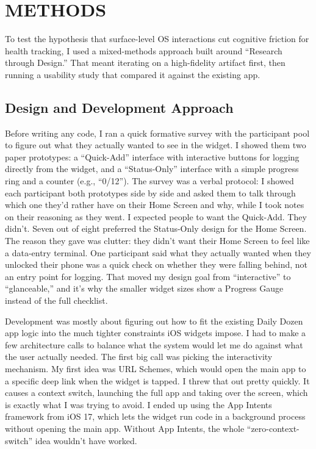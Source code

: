 \documentclass[10pt,twocolumn]{article}
\begin{document}
\section{METHODS}

To test the hypothesis that surface-level OS interactions cut cognitive friction for health tracking, I used a mixed-methods approach built around ``Research through Design.'' That meant iterating on a high-fidelity artifact first, then running a usability study that compared it against the existing app.

\subsection{Design and Development Approach}

Before writing any code, I ran a quick formative survey with the participant pool to figure out what they actually wanted to see in the widget. I showed them two paper prototypes: a ``Quick-Add'' interface with interactive buttons for logging directly from the widget, and a ``Status-Only'' interface with a simple progress ring and a counter (e.g., ``0/12''). The survey was a verbal protocol: I showed each participant both prototypes side by side and asked them to talk through which one they'd rather have on their Home Screen and why, while I took notes on their reasoning as they went. I expected people to want the Quick-Add. They didn't. Seven out of eight preferred the Status-Only design for the Home Screen. The reason they gave was clutter: they didn't want their Home Screen to feel like a data-entry terminal. One participant said what they actually wanted when they unlocked their phone was a quick check on whether they were falling behind, not an entry point for logging. That moved my design goal from ``interactive'' to ``glanceable,'' and it's why the smaller widget sizes show a Progress Gauge instead of the full checklist.

Development was mostly about figuring out how to fit the existing Daily Dozen app logic into the much tighter constraints iOS widgets impose.\cite{AppleHIGWidgets} I had to make a few architecture calls to balance what the system would let me do against what the user actually needed. The first big call was picking the interactivity mechanism. My first idea was URL Schemes, which would open the main app to a specific deep link when the widget is tapped. I threw that out pretty quickly. It causes a context switch, launching the full app and taking over the screen, which is exactly what I was trying to avoid. I ended up using the App Intents framework from iOS 17,\cite{AppleHIGWidgets} which lets the widget run code in a background process without opening the main app. Without App Intents, the whole ``zero-context-switch'' idea wouldn't have worked.
\end{document}
